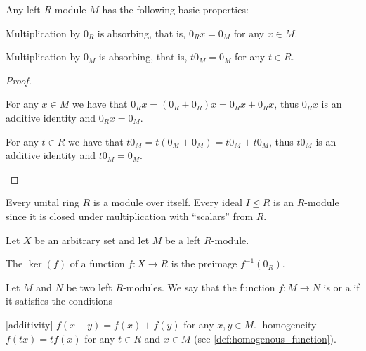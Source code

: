 \begin{proposition}\label{def:left_module_properties}
  Any left \( R \)-module \( M \) has the following basic properties:
  \begin{defenum}
     Multiplication by \( 0_R \) is absorbing, that is, \( 0_R x = 0_M \) for any \( x \in M \).

     Multiplication by \( 0_M \) is absorbing, that is, \( t 0_M = 0_M \) for any \( t \in R \).
  \end{defenum}
\end{proposition}
\begin{proof}\mbox{}
  \begin{itemize}
     For any \( x \in M \) we have that \( 0_R x = (0_R + 0_R)x = 0_R x + 0_R x \), thus \( 0_R x \) is an additive identity and \( 0_R x = 0_M \).

     For any \( t \in R \) we have that \( t 0_M = t (0_M + 0_M) = t 0_M + t 0_M \), thus \( t 0_M \) is an additive identity and \( t 0_M = 0_M \).
  \end{itemize}
\end{proof}

\begin{example}\label{ex:module/ideal_of_ring}
  Every unital ring \( R \) is a module over itself. Every ideal \( I \unlhd R \) is an \( R \)-module since it is closed under multiplication with \enquote{scalars} from \( R \).
\end{example}

\begin{definition}\label{def:left_module_kernel}
  Let \( X \) be an arbitrary set and let \( M \) be a left \( R \)-module.

  The  \( \ker(f) \) of a function \( f: X \to R \) is the preimage \( f^{-1}(0_R) \).
\end{definition}

\begin{definition}\label{def:linear_operator}
  Let \( M \) and \( N \) be two left \( R \)-modules. We say that the function \( f: M \to N \) is  or a  if it satisfies the conditions
  \begin{description}
    [additivity] \( f(x + y) = f(x) + f(y) \) for any \( x, y \in M \).
    [homogeneity] \( f(tx) = t f(x) \) for any \( t \in R \) and \( x \in M \) (see \cref{def:homogenous_function}).
  \end{description}
\end{definition}

